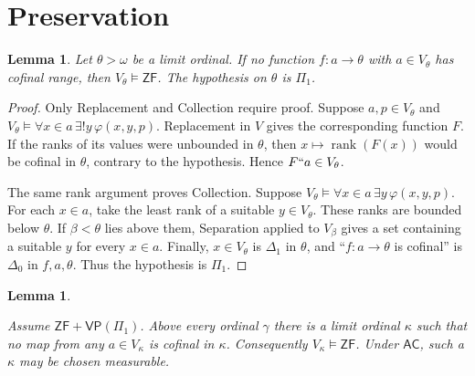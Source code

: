 \documentclass[11pt,a4paper]{amsart}
\newcommand{\VP}{\mathsf{VP}}
\newcommand{\AC}{\mathsf{AC}}
\newcommand{\ZF}{\mathsf{ZF}}
\newcommand{\rank}{\operatorname{rank}}
\theoremstyle{plain}
\newtheorem{lemma}[theorem]{Lemma}
\theoremstyle{definition}
\theoremstyle{remark}
\begin{document}
\section{Preservation}

\begin{lemma}\label{lem:ZF-rank-criterion}
Let $\theta>\omega$ be a limit ordinal.  If no function $f:a\to\theta$ with $a\in V_\theta$ has cofinal range, then $V_\theta\models\ZF$.  The hypothesis on $\theta$ is $\Pi_1$.
\end{lemma}

\begin{proof}
Only Replacement and Collection require proof.  Suppose $a,p\in V_\theta$ and $V_\theta\models\forall x\in a\,\exists!y\,\varphi(x,y,p)$.  Replacement in $V$ gives the corresponding function $F$.  If the ranks of its values were unbounded in $\theta$, then $x\mapsto\rank(F(x))$ would be cofinal in $\theta$, contrary to the hypothesis.  Hence $F``a\in V_\theta$.

The same rank argument proves Collection.  Suppose $V_\theta\models\forall x\in a\,\exists y\,\varphi(x,y,p)$.  For each $x\in a$, take the least rank of a suitable $y\in V_\theta$.  These ranks are bounded below $\theta$.  If $\beta<\theta$ lies above them, Separation applied to $V_\beta$ gives a set containing a suitable $y$ for every $x\in a$.  Finally, $x\in V_\theta$ is $\Delta_1$ in $\theta$, and ``$f:a\to\theta$ is cofinal'' is $\Delta_0$ in $f,a,\theta$.  Thus the hypothesis is $\Pi_1$.
\end{proof}

\begin{lemma}\label{lem:ZF-ranks}

{\color{auditgreen}Assume $\ZF+\VP(\Pi_1)$.  Above every ordinal} $\gamma$ there is a limit ordinal $\kappa$ such that no map from any $a\in V_\kappa$ is cofinal in $\kappa$.  Consequently $V_\kappa\models\ZF$.  Under $\AC$, such a $\kappa$ may be chosen measurable.
\end{lemma}
\end{document}
